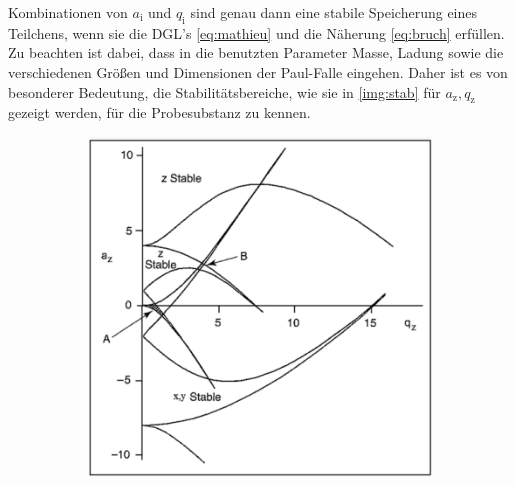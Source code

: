 \documentclass[numbers=noenddot,a4paper,notitlepage,twoside,BCOR15mm]{scrartcl}
\newcommand{\ix}[1]{_\text{#1}}
\begin{document}
		Kombinationen von $a\ix{i}$ und $q\ix{i}$ sind genau dann eine stabile Speicherung eines Teilchens, wenn sie die DGL's \autoref{eq:mathieu} und die Näherung \autoref{eq:bruch} erfüllen. Zu beachten ist dabei, dass in die benutzten Parameter Masse, Ladung sowie die verschiedenen Größen und Dimensionen der Paul-Falle eingehen. Daher ist es von besonderer Bedeutung, die Stabilitätsbereiche, wie sie in \autoref{img:stab} für $a\ix{z},q\ix{z}$ gezeigt werden, für die Probesubstanz zu kennen.

			\begin{figure}[t]
				\centering
				\begin{subfigure}[t]{0.4\textwidth}
					\includegraphics[width=\textwidth]{stab_1.png}
					\caption{}\label{img:stab1}
				\end{subfigure}
				\vspace{0.2cm}
				\begin{subfigure}[t]{0.37\textwidth}

\end{subfigure}
\end{figure}
\end{document}
